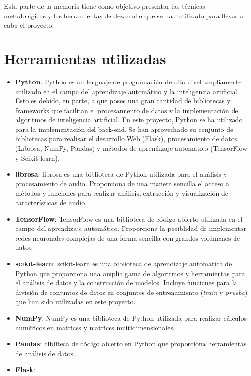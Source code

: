 
Esta parte de la memoria tiene como objetivo presentar las técnicas metodológicas y las herramientas de desarrollo que se han utilizado para llevar a cabo el proyecto.

\section{Herramientas utilizadas}
\begin{itemize}
\tightlist
\item \textbf{Python}: Python es un lenguaje de programación de alto nivel ampliamente utilizado en el campo del aprendizaje automático y la inteligencia artificial. Esto es debido, en parte, a que posee una gran cantidad de bibliotecas y frameworks que facilitan el procesamiento de datos y la implementación de algoritmos de inteligencia artificial.
En este proyecto, Python se ha utilizado para la implementación del back-end. Se han aprovechado su conjunto de bibliotecas para realizar el desarrollo Web (Flask), procesamiento de datos (Librosa, NumPy, Pandas) y métodos de aprendizaje automático (TensorFlow y Scikit-learn).

\item \textbf{librosa}: librosa es una biblioteca de Python utilizada para el análisis y procesamiento de audio. Proporciona de una manera sencilla el acceso a métodos y funciones para realizar análisis, extracción y visualización de características de audio.

\item \textbf{TensorFlow}: TensorFlow es una biblioteca de código abierto utilizada en el campo del aprendizaje automático. Proporciona la posiblidad de implementar redes neuronales complejas de una forma sencilla con grandes volúmenes de datos.

\item \textbf{scikit-learn}: scikit-learn es una biblioteca de aprendizaje automático de Python que proporciona una amplia gama de algoritmos y herramientas para el análisis de datos y la construcción de modelos. Incluye funciones para la división de conjuntos de datos en conjuntos de entrenamiento (\textit{train} y \textit{prueba}) que han sido utilizadas en este proyecto.

\item \textbf{NumPy}: NumPy es una biblioteca de Python utilizada para realizar cálculos numéricos en matrices y matrices multidimensionales. 

\item \textbf{Pandas}: bibliteca de código abierto en Python que proporciona herramientas de análisis de datos.

\item \textbf{Flask}: 
\end{itemize}

